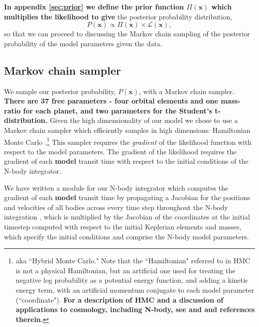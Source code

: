 \documentclass[twocolumn]{aastex63}
\begin{document}
\textbf{In appendix \ref{sec:prior} we define the prior function $\Pi(\mathbf{x})$
which multiplies the likelihood to give}
the posterior probability distribution,
\begin{equation}
    P(\mathbf{x}) \propto \Pi(\mathbf{x}){\times}\mathcal{L}(\mathbf{x}),
\end{equation}
so that we can proceed to discussing the Markov chain sampling of the posterior probability of the model parameters given the data.

\subsection{Markov chain sampler}

We sample our posterior probability, $P(\mathbf{x})$, with a Markov chain sampler.
\textbf{There are 37 free parameters - four orbital elements and one mass-ratio for
each planet, and two parameters for the Student's t-distribution.}
Given the high dimensionality of our model we chose to use
a Markov chain sampler which efficiently samples in high dimensions:  Hamiltonian
Monte Carlo \citep[HMC; ][]{Duane1987,Neal2011,Betancourt2017,Monnahan2016}.\footnote{aka ``Hybrid Monte Carlo." Note
    that the ``Hamiltonian" referred to in HMC is not a physical Hamiltonian, but an
    artificial one used for treating the negative log probability as a potential
    energy function, and adding a kinetic energy term, with an artificial momentum conjugate
    to each model parameter (``coordinate"). \textbf{For a description of HMC and a discussion of
    applications to cosmology, including N-body, see \citet{Leclercq2014} and \citet{Jasche2010} and references therein.}}  This
sampler requires the {\it gradient} of the likelihood function with respect to
the model parameters.  The gradient of the likelihood requires the gradient
of each \textbf{model} transit time with respect to the initial conditions of the N-body
integrator.

We have written a module for our N-body integrator which computes the
gradient of each \textbf{model} transit time by propagating a Jacobian for the positions
and velocities of all bodies across every time step throughout the N-body
integration \citep{Agol2020}, which is multiplied by the Jacobian of the coordinates at the initial timestep computed with respect to the initial Keplerian elements and masses, which specify the initial conditions and comprise the N-body model parameters.
\end{document}
